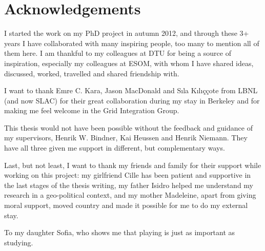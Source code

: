 \chapter{Acknowledgements}
I started the work on my PhD project in autumn 2012, and through these 3+ years I have collaborated with many inspiring people, too many to mention all of them here. I am thankful to my colleagues at DTU for being a source of inspiration, especially my colleagues at ESOM, with whom I have shared ideas, discussed, worked, travelled and shared friendship with.

I want to thank Emre C. Kara, Jason MacDonald and S{\i}la K{\i}l{\i}\c{c}\c{c}ote from LBNL (and now SLAC) for their great collaboration during my stay in Berkeley and for making me feel welcome in the Grid Integration Group. %

This thesis would not have been possible without the feedback and guidance of my supervisors, Henrik W. Bindner, Kai Heussen and Henrik Niemann. They have all three given me support in different, but complementary ways.

Last, but not least, I want to thank my friends and family for their support while working on this project: my girlfriend Cille has been patient and supportive in the last stages of the thesis writing, my father Isidro helped me understand my research in a geo-political context, and my mother Madeleine, apart from giving moral support, moved country and made it possible for me to do my external stay.

To my daughter Sofia, who shows me that playing is just as important as studying.
%
%
%
